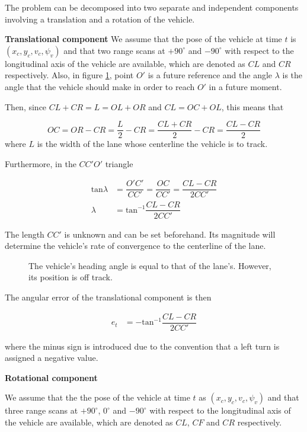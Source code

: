 The problem can be decomposed into two separate and independent
components involving a translation and a rotation of the vehicle.


\textbf{Translational component}
We assume that the pose of the vehicle at time $t$ is
$(x_c, y_c, v_c, \psi_v)$ and that two range scans at $+90^\circ$ and
$-90^\circ$ with respect to the longitudinal axis of the
vehicle are available, which are denoted as $CL$ and $CR$ respectively. Also,
in figure \ref{fig:centerline_pid_translation}, point $O'$ is a future
reference and the angle $\lambda$ is the angle that the vehicle should
make in order to reach $O'$ in a future moment.

Then, since $CL + CR = L = OL + OR$ and $CL = OC + OL$, this means that

\begin{equation}
  OC = OR - CR = \dfrac{L}{2} - CR = \dfrac{CL + CR}{2} - CR = \dfrac{CL-CR}{2}
\end{equation}
where $L$ is the width of the lane whose centerline the vehicle is to track.

Furthermore, in the $CC'O'$ triangle

\begin{align}
  \text{tan}\lambda &= \dfrac{O'C'}{CC'} = \dfrac{OC}{CC'} = \dfrac{CL-CR}{2CC'} \\
  \lambda &= \text{tan}^{-1}\dfrac{CL-CR}{2CC'}
\end{align}

The length $CC'$ is unknown and can be set beforehand. Its magnitude
will determine the vehicle's rate of convergence to the centerline of the
lane.

\begin{figure}[H]\centering
  \scalebox{1}{}
  \caption{The vehicle's heading angle is equal to that of the lane's.
    However, its position is off track.}
  \label{fig:centerline_pid_translation}
\end{figure}

The angular error of the translational component is then

\begin{align}
  e_t &= -\text{tan}^{-1}\dfrac{CL-CR}{2CC'}
\end{align}

where the minus sign is introduced due to the
convention that a left turn is assigned a negative value.

\textbf{Rotational component}


We assume that the the pose of the vehicle at time $t$ as
$(x_c, y_c, v_c, \psi_v)$ and that three range scans
at $+90^\circ$, $0^\circ$ and $-90^\circ$ with respect to the
longitudinal axis of the vehicle are available, which are denoted as
$CL$, $CF$ and $CR$ respectively.

